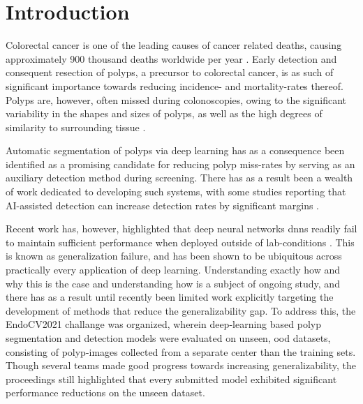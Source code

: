     \chapter{Introduction}
    Colorectal cancer is one of the leading causes of cancer related deaths, causing approximately 900 thousand deaths worldwide per year \cite{colorectal_cancer}. Early detection and consequent resection of polyps, a precursor to colorectal cancer, is as such of significant importance towards reducing incidence- and mortality-rates thereof. Polyps are, however, often missed during colonoscopies, owing to the significant variability in the shapes and sizes of polyps, as well as the high degrees of similarity to surrounding tissue \cite{missrate1, missrate2}. 
    
    Automatic segmentation of polyps via deep learning has as a consequence been identified as a promising candidate for reducing polyp miss-rates by serving as an auxiliary detection method during screening. There has as a result been a wealth of work dedicated to developing such systems, with some studies reporting that AI-assisted detection can increase detection rates by significant margins \cite{polyp-success-story}.  
    
    Recent work has, however, highlighted that deep neural networks \glspl{dnn} readily fail to maintain sufficient performance when deployed outside of lab-conditions \cite{damour2020underspecification, shortcut_learning, endocv2021}. This is known as generalization failure, and has been shown to be ubiquitous across practically every application of deep learning. Understanding exactly how and why this is the case and understanding how is a subject of ongoing study, and there has as a result until recently been limited work explicitly targeting the development of methods that reduce the generalizability gap. To address this, the EndoCV2021 challange was organized, wherein deep-learning based polyp segmentation and detection models were evaluated on unseen, \gls{ood} datasets, consisting of polyp-images collected from a separate center than the training sets. Though several teams made good progress towards increasing generalizability, the proceedings still highlighted that every submitted model exhibited significant performance reductions on the unseen dataset.

